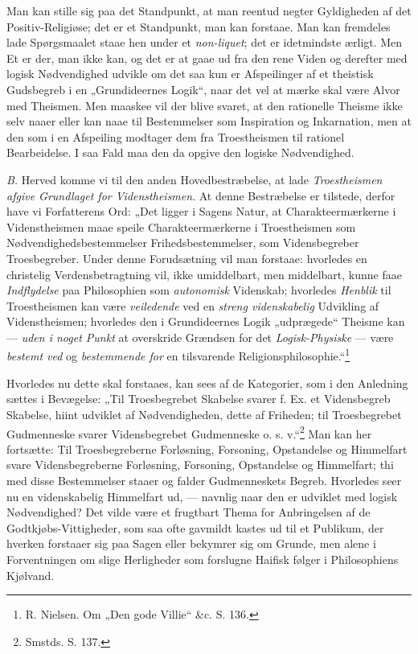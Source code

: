 \documentclass[12pt,a4paper]{book}
\newcommand{\opage}[1]{\marginnote{\footnotesize\textit{[#1]}}}
\begin{document}
Man kan stille sig paa det Standpunkt, at man
reentud negter Gyldigheden af det Positiv-Religiøse;
det er et Standpunkt, man kan forstaae. Man kan
fremdeles lade Spørgsmaalet staae hen under et \textit{non-liquet};
det er idetmindste ærligt. Men Et er der,
man ikke kan, og det er at gaae ud fra den rene Viden
og derefter med logisk Nødvendighed udvikle om
det saa kun er Afspeilinger af et theistisk Gudsbegreb
i en „Grundideernes Logik“, naar det vel at mærke skal
være Alvor med Theismen. Men maaskee vil der blive
svaret, at den rationelle Theisme ikke selv naaer eller
kan naae til Bestemmelser som Inspiration og Inkarnation,
\opage{74}\setcounter{footnote}{0}men at den som i en Afspeiling modtager dem fra
Troestheismen til rationel Bearbeidelse. I saa Fald
maa den da opgive den logiske Nødvendighed.

\textit{B.} Herved komme vi til den anden Hovedbestræbelse,
at lade \emph{Troestheismen afgive Grundlaget for
Videnstheismen}. At denne Bestræbelse er tilstede,
derfor have vi Forfatterens Ord: „Det ligger i Sagens
Natur, at Charakteermærkerne i Videnstheismen maae
speile Charakteermærkerne i Troestheismen som Nødvendighedsbestemmelser
Frihedsbestemmelser, som Vidensbegreber
Troesbegreber. Under denne Forudsætning vil
man forstaae: hvorledes en christelig Verdensbetragtning
vil, ikke umiddelbart, men middelbart, kunne faae \emph{Indflydelse}
paa Philosophien som \emph{autonomisk} Videnskab;
hvorledes \emph{Henblik} til Troestheismen kan være
\emph{veiledende} ved en \emph{streng videnskabelig} Udvikling
af Videnstheismen; hvorledes den i Grundideernes Logik
„udprægede“ Theisme kan --- \emph{uden i noget Punkt}
at overskride Grændsen for det \emph{Logisk-Physiske} ---
være \emph{bestemt ved} og \emph{bestemmende for} en tilsvarende
Religionsphilosophie.“\footnote{R. Nielsen. Om „Den gode Villie“ \&c. S. 136.}

Hvorledes nu dette skal forstaaes, kan sees af de
Kategorier, som i den Anledning sættes i Bevægelse:
„Til Troesbegrebet Skabelse svarer f. Ex. et Vidensbegreb
Skabelse, hiint udviklet af Nødvendigheden, dette
af Friheden; til Troesbegrebet Gudmenneske svarer Vidensbegrebet
Gudmenneske o. s. v.“\footnote{Smstds. S. 137.} Man kan her
\opage{75}\setcounter{footnote}{0}fortsætte: Til Troesbegreberne Forløsning, Forsoning, Opstandelse
og Himmelfart svare Vidensbegreberne Forløsning,
Forsoning, Opstandelse og Himmelfart; thi med disse Bestemmelser
staaer og falder Gudmenneskets Begreb. Hvorledes
seer nu en videnskabelig Himmelfart ud, ---
navnlig naar den er udviklet med logisk Nødvendighed?
Det vilde være et frugtbart Thema for Anbringelsen af
de Godtkjøbs-Vittigheder, som saa ofte gavmildt kastes ud
til et Publikum, der hverken forstaaer sig paa Sagen
eller bekymrer sig om Grunde, men alene i Forventningen
om slige Herligheder som forslugne Haifisk følger
i Philosophiens Kjølvand.
\end{document}
